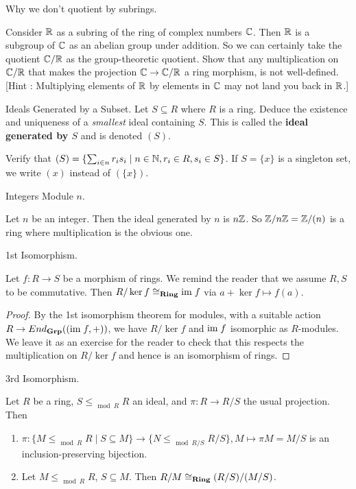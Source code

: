 \documentclass[../../book.tex]{subfiles}
\begin{document}
\begin{ex} Why we don't quotient by subrings.
    
    Consider $\mathbb{R}$ as a subring of the ring of complex numbers $\mathbb{C}$.
    Then $\mathbb{R}$ is a subgroup of $\mathbb{C}$ as an abelian group under addition.
    So we can certainly take the quotient $\mathbb{C}/\mathbb{R}$ as the group-theoretic quotient.
    Show that any multiplication on $\mathbb{C}/\mathbb{R}$ that 
    makes the projection $\mathbb{C} \to \mathbb{C}/\mathbb{R}$ a ring morphism, is not well-defined.
    [Hint : Multiplying elements of $\mathbb{R}$ by elements in $\mathbb{C}$ may not
    land you back in $\mathbb{R}$.]
    
\end{ex}
\begin{ex} Ideals Generated by a Subset. 
    Let $S \subseteq R$ where $R$ is a ring. 
    Deduce the existence and uniqueness of a \emph{smallest} ideal containing $S$.
    This is called the \textbf{ideal generated by $S$} and 
    is denoted $(S)$. 
    
    Verify that $(S) = 
    \{ \sum_{i \in n} r_i s_i \mid n \in \mathbb{N}, r_i \in R, s_i \in S\}$. 
    If $S = \{x\}$ is a singleton set, we write $(x)$ instead of $(\{x\})$. 
\end{ex}
\begin{eg} Integers Module $n$.
    
    Let $n$ be an integer. 
    Then the ideal generated by $n$ is $n\mathbb{Z}$.
    So $\mathbb{Z} / n\mathbb{Z} = \mathbb{Z} / (n)$ is a ring
    where multiplication is the obvious one. 
    
\end{eg}
\begin{thm} 1st Isomorphism.
    
    Let $f : R \to S$ be a morphism of rings. 
    We remind the reader that we assume $R, S$ to be commutative. 
    Then $R/\ker f \cong_{\mathbf{Ring}} \textnormal{im}\; f$ via $a + \ker f \mapsto f(a)$. 
\end{thm}
\begin{proof}
    By the 1st isomorphism theorem for modules, 
    with a suitable action $R \to End_{\mathbf{Grp}}((\textnormal{im}\; f, +))$,
    we have $R/\ker f$ and $\textnormal{im}\; f$ isomorphic as $R$-modules. 
    We leave it as an exercise for the reader to check that
    this respects the multiplication on $R/\ker f$ and
    hence is an isomorphism of rings.
\end{proof}
\begin{thm} 3rd Isomorphism.

    Let $R$ be a ring, $S \leq_{\mod{R}} R$ an ideal, and
    $\pi : R \to R/S$ the usual projection. 
    Then
    \begin{enumerate}
        \item $\pi : 
        \{M \leq_{\mod{R}} R \mid S \subseteq M\} \to \{N \leq_{\mod{R/S}} R/S\}, 
        M \mapsto \pi M = M/S$ is an inclusion-preserving bijection.
        \item Let $M \leq_{\mod{R}} R$, $S \subseteq M$. 
        Then $R / M \cong_{\mathbf{Ring}} (R / S) / (M / S)$. 
    \end{enumerate}
\end{thm}
\end{document}
